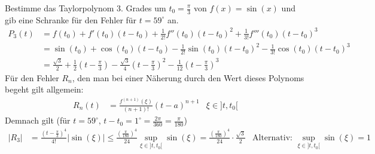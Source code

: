 \documentclass[a4paper]{article}
\begin{document}
		\begin{fmerke}
			Bestimme das Taylorpolynom $3$. Grades um $t_0 = \tfrac{\pi}{3}$ von $f(x)= \sin(x)$ und gib eine Schranke für den Fehler für $t=59^\circ$ an.
				\begin{align*}
					P_3(t) &= f(t_0) + f'(t_0)(t-t_0) + \frac{1}{2!}f''(t_0)(t-t_0)^2 + \frac{1}{3!}f'''(t_0)(t-t_0)^3\\
						   &= \sin(t_0) + \cos(t_0)(t-t_0) - \frac{1}{2!}\sin(t_0)(t-t_0)^2 - \frac{1}{3!}\cos(t_0)(t-t_0)^3\\
						   &= \frac{\sqrt{3}}{2} + \frac{1}{2}\left(t-\frac{\pi}{3}\right) - \frac{\sqrt{3}}{4}\left(t-\frac{\pi}{3}\right)^2 - \frac{1}{12}\left(t-\frac{\pi}{3}\right)^3
				\end{align*}
			Für den Fehler $R_n$, den man bei einer Näherung durch den Wert dieses Polynoms begeht gilt allgemein: 
				\begin{align*}
					R_{n}(t) &= \frac{f^{(n+1)}(\xi)}{(n+1)!}(t-a)^{n+1} & \xi \in ]t,t_0[
				\end{align*}
			Demnach gilt (für $t=59^\circ$, $t-t_0 = 1^\circ = \tfrac{2\pi}{360}= \tfrac{\pi}{180}$)
				\begin{align*}
					|R_3| &= \frac{\left(t-\frac{\pi}{3}\right)^4}{4!}|\sin(\xi)| \leq \frac{\left(\frac{\pi}{180}\right)^4}{24} \sup_{\xi \in ]t,t_0[} \sin(\xi) = \frac{\left(\frac{\pi}{180}\right)^4}{24}\cdot \frac{\sqrt{3}}{2} &\text{Alternativ:  $\sup_{\xi \in ]t,t_0[} \sin(\xi) =1$}
				\end{align*}

		\end{fmerke}
\end{document}
